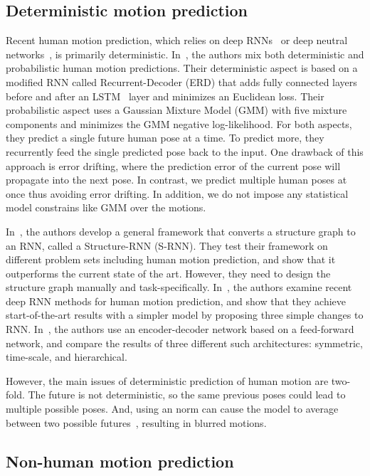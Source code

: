 \documentclass[10pt,twocolumn,letterpaper]{article}
\begin{document}
\subsection {Deterministic motion prediction}

Recent human motion prediction, which relies on deep RNNs~\cite{iccv2015:Katerina, cvpr2016:Ashesh, cvpr2017:julieta} or deep neutral networks~\cite{corr2017:Judith}, is primarily deterministic. In~\cite{iccv2015:Katerina}, the authors mix both deterministic and probabilistic human motion predictions. Their deterministic aspect is based on a modified RNN called Recurrent-Decoder (ERD) that adds fully connected layers before and after an LSTM~\cite{nc1997:Hochreiter} layer and minimizes an Euclidean loss. Their probabilistic aspect uses a Gaussian Mixture Model (GMM) with five mixture components and minimizes the GMM negative log-likelihood. For both aspects, they predict a single future human pose at a time. To predict more, they recurrently feed the single predicted pose back to the input. One drawback of this approach is error drifting, where the prediction error of the current pose will propagate into the next pose. In contrast, we predict multiple human poses at once thus avoiding error drifting. In addition, we do not impose any statistical model constrains like GMM over the motions.

In~\cite{cvpr2016:Ashesh}, the authors develop a general framework that converts a structure graph to an RNN, called a Structure-RNN (S-RNN). They test their framework on different problem sets including human motion prediction, and show that it outperforms the current state of the art. However, they need to design the structure graph manually and task-specifically. In~\cite{cvpr2017:julieta}, the authors examine recent deep RNN methods for human motion prediction, and show that they achieve start-of-the-art results with a simpler model by proposing three simple changes to RNN. In~\cite{corr2017:Judith}, the authors use an encoder-decoder network based on a feed-forward network, and compare the results of three different such architectures: symmetric, time-scale, and hierarchical.

However, the main issues of deterministic prediction of human motion are two-fold. The future is not deterministic, so the same previous poses could lead to multiple possible poses. And, using an  norm can cause the model to average between two possible futures~\cite{corr2015:Mathieu}, resulting in blurred motions.

\subsection {Non-human motion prediction}
\end{document}
